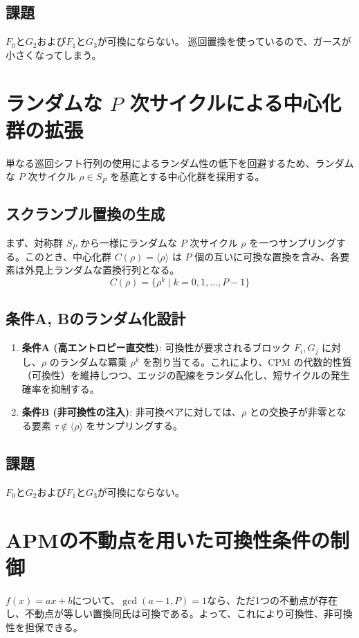\documentclass[a4paper,11pt,dvipdfmx]{jsarticle}
\theoremstyle{definition}
\begin{document}
\subsection{課題}
$F_0$と$G_2$および$F_1$と$G_3$が可換にならない。
巡回置換を使っているので、ガースが小さくなってしまう。

\section{ランダムな $P$ 次サイクルによる中心化群の拡張}

単なる巡回シフト行列の使用によるランダム性の低下を回避するため、ランダムな $P$ 次サイクル $\rho \in S_P$ を基底とする中心化群を採用する。

\subsection{スクランブル置換の生成}
まず、対称群 $S_P$ から一様にランダムな $P$ 次サイクル $\rho$ を一つサンプリングする。このとき、中心化群 $C(\rho) = \langle \rho \rangle$ は $P$ 個の互いに可換な置換を含み、各要素は外見上ランダムな置換行列となる。
\begin{equation}
    C(\rho) = \{ \rho^k \mid k = 0, 1, \dots, P-1 \}
\end{equation}

\subsection{条件A, Bのランダム化設計}
\begin{enumerate}
    \item \textbf{条件A (高エントロピー直交性)}: 
    可換性が要求されるブロック $F_i, G_j$ に対し、$\rho$ のランダムな冪乗 $\rho^k$ を割り当てる。これにより、CPM の代数的性質（可換性）を維持しつつ、エッジの配線をランダム化し、短サイクルの発生確率を抑制する。
    \item \textbf{条件B (非可換性の注入)}: 
    非可換ペアに対しては、$\rho$ との交換子が非零となる要素 $\tau \notin \langle \rho \rangle$ をサンプリングする。
\end{enumerate}

\subsection{課題}
$F_0$と$G_2$および$F_1$と$G_3$が可換にならない。

\section{APMの不動点を用いた可換性条件の制御}
$f(x)=ax+b$について、$\gcd(a-1, P)=1$なら、ただ1つの不動点が存在し、不動点が等しい置換同氏は可換である。よって、これにより可換性、非可換性を担保できる。
\end{document}
